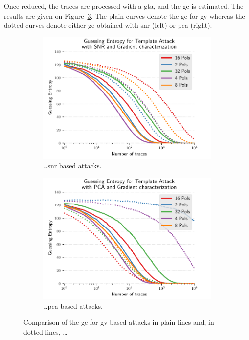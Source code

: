 Once reduced, the traces are processed with a \gls{gta}, and the \gls{ge} is estimated.
The results are given on Figure~\ref{fig:ta_pois}. 
The plain curves denote the \gls{ge} for \gls{gv} whereas the dotted curves denote either \gls{ge} obtained with \gls{snr} (left) or \gls{pca} (right).

\begin{figure}
	\centering
    \begin{subfigure}{0.49 \textwidth}
        \includegraphics[width=\textwidth]{figures/ASCAD_700/with_mask_no_desynchro/GE_VBP_SNR_review}
        \caption{\ldots \gls{snr} based attacks.}
        \label{fig:ta_pois_snr}
    \end{subfigure}
    \begin{subfigure}{0.49 \textwidth}
        \includegraphics[width=\textwidth]{figures/ASCAD_700/with_mask_no_desynchro/GE_VBP_PCA_review}
        \caption{\ldots \gls{pca} based attacks.}
        \label{fig:ta_pois_pca}
    \end{subfigure}
	\caption{Comparison of the \gls{ge} for \gls{gv} based attacks in plain lines and, in dotted lines, \ldots}
	\label{fig:ta_pois}
\end{figure}

